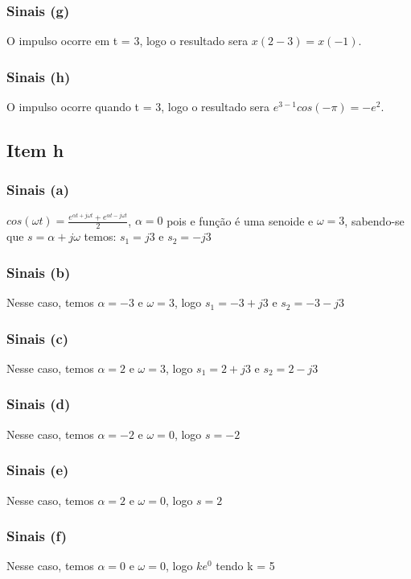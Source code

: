 \documentclass[a4paper, 12pt]{article}
\begin{document}
            \subsubsection{Sinais (g)}
            O impulso ocorre em t = 3, logo o resultado sera $x(2-3) = x(-1)$.
            \subsubsection{Sinais (h)}
            O impulso ocorre quando t = 3, logo o resultado sera $e^{3-1}cos(-\pi) = -e^{2}$.
        \subsection{Item h}
            \subsubsection{Sinais (a)}
            $cos(\omega t) = \frac{e^{\alpha t + j\omega t} + e^{\alpha t - j\omega t}}{2}$, $\alpha = 0$ pois e função é uma senoide e $\omega = 3$, sabendo-se que $s = \alpha + j\omega$ temos: $s_{1} = j3$ e $ s_{2} = -j3 $
            \subsubsection{Sinais (b)}
            Nesse caso, temos $\alpha = -3$ e $\omega = 3$, logo $s_{1} = -3 + j3$ e $s_{2} = -3 - j3$
            \subsubsection{Sinais (c)}
            Nesse caso, temos $\alpha = 2$ e $\omega = 3$, logo $s_{1} = 2 + j3$ e $s_{2} = 2 - j3$
            \subsubsection{Sinais (d)}
            Nesse caso, temos $\alpha = -2$ e $\omega = 0$, logo $s = -2$
            \subsubsection{Sinais (e)}
            Nesse caso, temos $\alpha = 2$ e $\omega = 0$, logo $s = 2$
            \subsubsection{Sinais (f)}
            Nesse caso, temos $\alpha = 0$ e $\omega = 0$, logo $ke^{0}$ tendo k = 5
\end{document}
